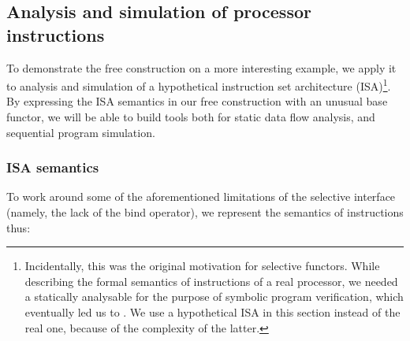 




\subsection{Analysis and simulation of processor instructions}\label{sec-free-isa}

To demonstrate the free construction on a more interesting example, we apply it
to analysis and simulation of a hypothetical instruction set architecture
(ISA)\footnote{Incidentally, this was the original motivation for selective
functors. While describing the formal semantics of instructions of a real
processor, we needed a statically analysable  for the purpose of
symbolic program verification, which eventually led us to . We use a
hypothetical ISA in this section instead of the real one, because of the
complexity of the latter.}. By expressing the ISA semantics in our
free construction with an unusual base functor, we will be able to build
tools both for static data flow analysis, and sequential program simulation.

\subsubsection{ISA semantics}

To work around some of the aforementioned limitations of the selective
interface (namely, the lack of the bind operator), we represent the semantics of
instructions thus:

